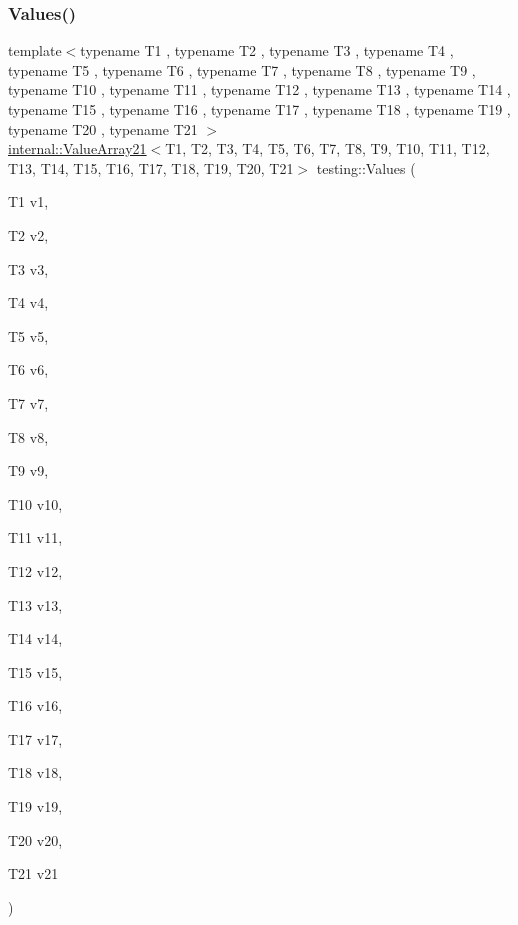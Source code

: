 \subsubsection{\texorpdfstring{Values()}{Values()}\hspace{0.1cm}{\footnotesize\ttfamily [21/50]}}
{\footnotesize\ttfamily template$<$typename T1 , typename T2 , typename T3 , typename T4 , typename T5 , typename T6 , typename T7 , typename T8 , typename T9 , typename T10 , typename T11 , typename T12 , typename T13 , typename T14 , typename T15 , typename T16 , typename T17 , typename T18 , typename T19 , typename T20 , typename T21 $>$ \\
\mbox{\hyperlink{classtesting_1_1internal_1_1ValueArray21}{internal\+::\+Value\+Array21}}$<$T1, T2, T3, T4, T5, T6, T7, T8, T9, T10, T11, T12, T13, T14, T15, T16, T17, T18, T19, T20, T21$>$ testing\+::\+Values (\begin{DoxyParamCaption}\item[{T1}]{v1,  }\item[{T2}]{v2,  }\item[{T3}]{v3,  }\item[{T4}]{v4,  }\item[{T5}]{v5,  }\item[{T6}]{v6,  }\item[{T7}]{v7,  }\item[{T8}]{v8,  }\item[{T9}]{v9,  }\item[{T10}]{v10,  }\item[{T11}]{v11,  }\item[{T12}]{v12,  }\item[{T13}]{v13,  }\item[{T14}]{v14,  }\item[{T15}]{v15,  }\item[{T16}]{v16,  }\item[{T17}]{v17,  }\item[{T18}]{v18,  }\item[{T19}]{v19,  }\item[{T20}]{v20,  }\item[{T21}]{v21 }\end{DoxyParamCaption})}

\mbox{\label{namespacetesting_aadfff0d803156b98ff1ffa5f1d95c350}} 

